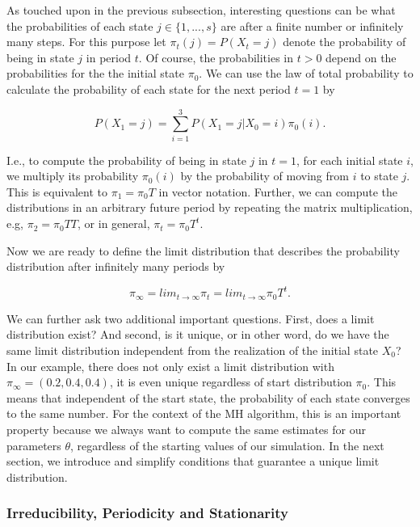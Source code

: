 \documentclass[12pt,english,a4paper,oneside]{article}
\theoremstyle{definition}
\theoremstyle{definition}
\theoremstyle{definition}
\theoremstyle{definition}
\theoremstyle{remark}
\begin{document}
As touched upon in the previous subsection, interesting questions can be what the probabilities of each state \(j \in \{1, ..., s\}\) are after a finite number or infinitely many steps. For this purpose let \(\pi_t (j) = P(X_t = j)\) denote the probability of being in state \(j\) in period \(t\). Of course, the probabilities in \(t>0\) depend on the probabilities for the the initial state \(\pi_0\). We can use the law of total probability to calculate the probability of each state for the next period \(t=1\) by

\begin{equation}
\label{eq:tot-prob}
P(X_1 = j) = \sum_{i=1}^{3} P(X_1 = j | X_0 = i) \pi_0(i).
\end{equation}

\noindent
I.e., to compute the probability of being in state \(j\) in \(t=1\), for each initial state \(i\), we multiply its probability \(\pi_0(i)\) by the probability of moving from \(i\) to state \(j\). This is equivalent to \(\pi_1 = \pi_0 T\) in vector notation. Further, we can compute the distributions in an arbitrary future period by repeating the matrix multiplication, e.g, \(\pi_2 = \pi_0 T T\), or in general, \(\pi_t = \pi_0 T^t\).

Now we are ready to define the limit distribution that describes the probability distribution after infinitely many periods by

\begin{equation}
\label{eq:lim-dist}
\pi_{\infty} = lim_{t \rightarrow \infty} \pi_t = lim_{t \rightarrow \infty} \pi_0 T^t.
\end{equation}

\noindent
We can further ask two additional important questions. First, does a limit distribution exist? And second, is it unique, or in other word, do we have the same limit distribution independent from the realization of the initial state \(X_0\)? In our example, there does not only exist a limit distribution with \(\pi_{\infty} = (0.2, 0.4, 0.4)\), it is even unique regardless of start distribution \(\pi_0\). This means that independent of the start state, the probability of each state converges to the same number. For the context of the MH algorithm, this is an important property because we always want to compute the same estimates for our parameters \(\theta\), regardless of the starting values of our simulation. In the next section, we introduce and simplify conditions that guarantee a unique limit distribution.

\hypertarget{irreducibility-periodicity-and-stationarity}{%
\subsubsection{Irreducibility, Periodicity and Stationarity}\label{irreducibility-periodicity-and-stationarity}}
\end{document}
